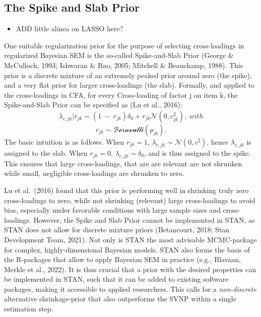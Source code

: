\documentclass[
  man, donotrepeattitle,floatsintext]{apa6}
\providecommand{\tightlist}{%
  \setlength{\itemsep}{0pt}\setlength{\parskip}{0pt}}
\begin{document}
\hypertarget{the-spike-and-slab-prior}{%
\subsection{The Spike and Slab Prior}\label{the-spike-and-slab-prior}}

\begin{itemize}
\tightlist
\item
  ADD little alinea on LASSO here?
\end{itemize}

One suitable regularization prior for the purpose of selecting cross-loadings in
regularized Bayesian SEM is the so-called Spike-and-Slab Prior (George \& McCulloch, 1993; Ishwaran \& Rao, 2005; Mitchell \& Beauchamp, 1988). This prior is a discrete mixture of an extremely peaked prior around zero (the spike), and a very flat prior for larger cross-loadings (the slab). Formally, and applied to the cross-loadings in CFA, for every Cross-loading of factor j
on item k, the Spike-and-Slab Prior can be specified as (Lu et al., 2016):
\[\lambda_{c,jk} |r_{jk} \sim (1 \ - \ r_{jk})\delta_0 + r_{jk} \mathcal{N}(0, c^2_{jk}) , \ with\]
\[r_{jk} \sim \mathcal{Bernoulli}(p_{jk}).\]
The basic intuition is as follows. When \(r_{jk} = 1\), \(\lambda_{c,jk} \sim \mathcal{N}(0, c^2)\), hence \(\lambda_{c,jk}\) is assigned to the slab. When \(r_{jk} = 0\), \(\lambda_{c,jk} \sim \delta_0\), and is thus assigned to the spike. This ensures that large cross-loadings, that are are relevant are not shrunken while small, negligible cross-loadings are shrunken to zero.

Lu et al.~(2016) found that this prior is performing well in shrinking truly zero cross-loadings to zero, while not shrinking (relevant) large cross-loadings to avoid bias, especially under favorable conditions with large sample sizes and cross-loadings. However, the Spike and Slab Prior cannot be implemented in STAN, as STAN does not allow for discrete mixture priors (Betancourt, 2018; Stan Development Team, 2021). Not only is STAN the most advisable MCMC-package for complex, highly-dimensional Bayesian models. STAN also forms the basis of the R-packages that allow to apply Bayesian SEM in practice (e.g., Blavaan, Merkle et al., 2022). It is thus crucial that a prior with the desired properties can be implemented in STAN, such that it can be added to existing software packages, making it accessible to applied researchers. This calls for a \emph{non-discrete} alternative shrinkage-prior that also outperforms the SVNP within a single estimation step.
\end{document}
